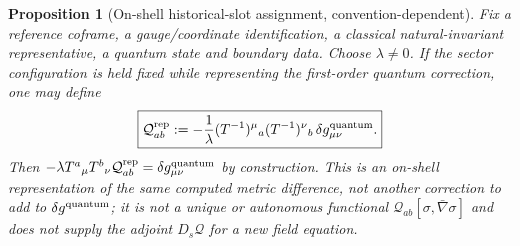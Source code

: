 \documentclass[11pt,a4paper]{article}
\newtheorem{proposition}[theorem]{Proposition}
\theoremstyle{remark}\newtheorem{remark}[theorem]{Remark}
\begin{document}
\begin{proposition}[On-shell historical-slot assignment, convention-dependent]\label{prop:qgd138-slot}
Fix a reference coframe, a gauge/coordinate identification, a classical
natural-invariant representative, a quantum state and boundary data.
Choose $\lambda\ne0$. If the sector configuration is held fixed while
representing the first-order quantum correction, one may define
\begin{equation}\label{eq:qgd138-slot}
 \boxed{\mathcal Q_{ab}^{\rm rep}:=-\frac1\lambda
 (T^{-1})^\mu{}_a(T^{-1})^\nu{}_b\,
 \delta g_{\mu\nu}^{\rm quantum}.}
\end{equation}
Then $-\lambda T^a{}_{\mu}T^b{}_{\nu}
\mathcal Q_{ab}^{\rm rep}=\delta g_{\mu\nu}^{\rm quantum}$ by construction.
This is an \emph{on-shell representation} of \emph{the same}
computed metric difference, not another correction to add to
$\delta g^{\rm quantum}$; it is not a unique or autonomous functional
$\mathcal Q_{ab}[\sigma,\bar\nabla\sigma]$ and does not
supply the adjoint $D_s\mathcal Q$ for a new field equation.
\end{proposition}
\end{document}
